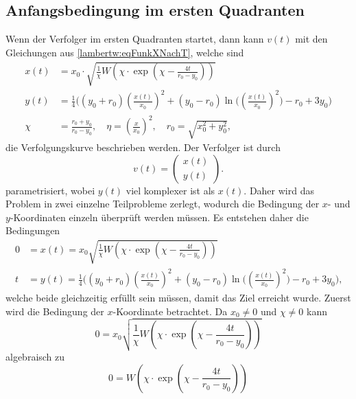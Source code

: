 \subsection{Anfangsbedingung im ersten Quadranten}
%
Wenn der Verfolger im ersten Quadranten startet, dann kann $v(t)$ mit den Gleichungen aus \eqref{lambertw:eqFunkXNachT}, welche sind
\begin{align}
    x\left(t\right)
    &=
    x_0\cdot\sqrt{\frac{1}{\chi}W\left(\chi\cdot \exp\left( \chi-\frac{4t}{r_0-y_0}\right) \right)} \\
    y(t)
    &=
    \frac{1}{4}\biggl(\left(y_0+r_0\right)\left(\frac{x(t)}{x_0}\right)^2+\left(y_0-r_0\right)\operatorname{ln}\biggl(\left(\frac{x(t)}{x_0}\right)^2\biggr)-r_0+3y_0\biggr)\\
    \chi
    &=
    \frac{r_0+y_0}{r_0-y_0}, \quad
    \eta
    =
    \left(\frac{x}{x_0}\right)^2,\quad
    r_0
    =
    \sqrt{x_0^2+y_0^2}
    \text{,}
\end{align}
%
die Verfolgungskurve beschrieben werden.
Der Verfolger ist durch
\begin{equation}
    v(t)
    =
    \left( \begin{array}{c} x(t) \\ y(t) \end{array} \right)
    \text{.}
\end{equation}
%
parametrisiert, wobei $y(t)$ viel komplexer ist als $x(t)$.
Daher wird das Problem in zwei einzelne Teilprobleme zerlegt, wodurch die Bedingung der $x$- und $y$-Koordinaten einzeln überprüft werden müssen. Es entstehen daher die Bedingungen
%
\begin{align}
    0
    &=
    x(t)
    =
    x_0\sqrt{\frac{1}{\chi}W\left(\chi\cdot \exp\left( \chi-\frac{4t}{r_0-y_0}\right)\right)}
    \\
    t
    &=
    y(t)
    =
    \frac{1}{4}\biggl(\left(y_0+r_0\right)\left(\frac{x(t)}{x_0}\right)^2+\left(y_0-r_0\right)\operatorname{ln}\biggl(\left(\frac{x(t)}{x_0}\right)^2\biggr)-r_0+3y_0\biggr)
    \text{,}
\end{align}
%
welche beide gleichzeitig erfüllt sein müssen, damit das Ziel erreicht wurde.
Zuerst wird die Bedingung der $x$-Koordinate betrachtet.
Da $x_0 \neq 0$ und $\chi \neq 0$ kann
\begin{equation}
    0
    =
    x_0\sqrt{\frac{1}{\chi}W\left(\chi\cdot \exp\left( \chi-\frac{4t}{r_0-y_0}\right)\right)}
\end{equation}
algebraisch zu
\begin{equation}
    0
    =
    W\left(\chi\cdot \exp\left( \chi-\frac{4t}{r_0-y_0}\right)\right)
\end{equation}
